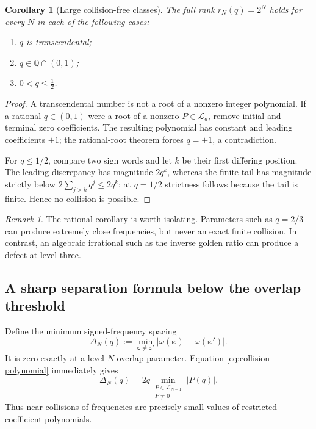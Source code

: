 \documentclass[11pt]{article}
\numberwithin{equation}{section}
\newtheorem{corollary}[theorem]{Corollary}
\theoremstyle{definition}
\theoremstyle{remark}
\newtheorem{remark}[theorem]{Remark}
\newcommand{\Q}{\mathbb Q}
\newcommand{\eps}{\varepsilon}
\newcommand{\abs}[1]{\left\lvert#1\right\rvert}
\begin{document}
\begin{corollary}[Large collision-free classes]
\label{cor:collision-free-classes}
The full rank $r_N(q)=2^N$ holds for every $N$ in each of the following cases:
\begin{enumerate}[label=(\roman*)]
 \item $q$ is transcendental;
 \item $q\in\Q\cap(0,1)$;
 \item $0<q\le\tfrac12$.
\end{enumerate}
\end{corollary}
\begin{proof}
A transcendental number is not a root of a nonzero integer polynomial.  If a
rational $q\in(0,1)$ were a root of a nonzero $P\in\mathscr L_d$, remove initial
and terminal zero coefficients.  The resulting polynomial has constant and
leading coefficients $\pm1$; the rational-root theorem forces $q=\pm1$, a
contradiction.

For $q\le1/2$, compare two sign words and let $k$ be their first differing
position.  The leading discrepancy has magnitude $2q^k$, whereas the finite
tail has magnitude strictly below
$2\sum_{j>k}q^j\le2q^k$; at $q=1/2$ strictness follows because the tail is
finite.  Hence no collision is possible.
\end{proof}

\begin{remark}
The rational corollary is worth isolating.  Parameters such as $q=2/3$ can
produce extremely close frequencies, but never an exact finite collision.  In
contrast, an algebraic irrational such as the inverse golden ratio can produce
a defect at level three.
\end{remark}

\subsection{A sharp separation formula below the overlap threshold}

Define the minimum signed-frequency spacing
\begin{equation}
 \Delta_N(q):=
 \min_{\bm\eps\ne\bm\eps'}
 \abs{\omega(\bm\eps)-\omega(\bm\eps')}.
 \label{eq:frequency-separation}
\end{equation}
It is zero exactly at a level-$N$ overlap parameter.  Equation
\eqref{eq:collision-polynomial} immediately gives
\begin{equation}
 \Delta_N(q)=2q
 \min_{\substack{P\in\mathscr L_{N-1}\\P\ne0}}
 \abs{P(q)}.
 \label{eq:separation-Littlewood}
\end{equation}
Thus near-collisions of frequencies are precisely small values of
restricted-coefficient polynomials.
\end{document}
